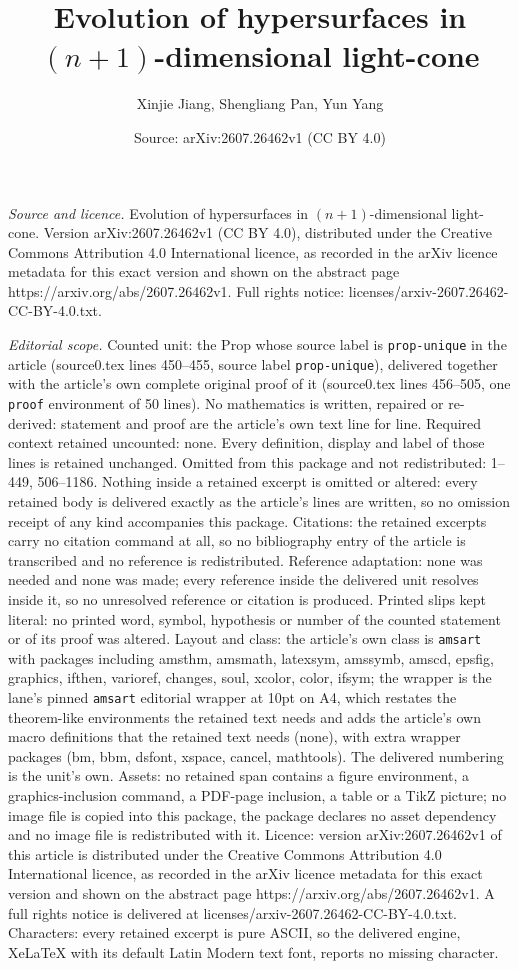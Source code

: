\documentclass[10pt,a4paper]{amsart}
\title[Evolution of hypersurfaces in $(n+1)$-dimensional light-cone]{Evolution of hypersurfaces in $(n+1)$-dimensional light-cone}
\author{Xinjie Jiang, Shengliang Pan, Yun Yang}
\date{Source: arXiv:2607.26462v1 (CC BY 4.0)}
\begin{document}
\maketitle

\noindent\emph{Source and licence.} Evolution of hypersurfaces in $(n+1)$-dimensional light-cone. Version arXiv:2607.26462v1 (CC BY 4.0), distributed under the Creative Commons Attribution 4.0 International licence, as recorded in the arXiv licence metadata for this exact version and shown on the abstract page https://arxiv.org/abs/2607.26462v1. Full rights notice: licenses/arxiv-2607.26462-CC-BY-4.0.txt.\par\smallskip

\noindent\textit{Editorial scope.} Counted unit: the Prop whose source label is \texttt{prop-unique} in the article (source0.tex lines 450--455, source label \texttt{prop-unique}), delivered together with the article's own complete original proof of it (source0.tex lines 456--505, one \texttt{proof} environment of 50 lines). No mathematics is written, repaired or re-derived: statement and proof are the article's own text line for line. Required context retained uncounted: none. Every definition, display and label of those lines is retained unchanged. Omitted from this package and not redistributed: 1--449, 506--1186. Nothing inside a retained excerpt is omitted or altered: every retained body is delivered exactly as the article's lines are written, so no omission receipt of any kind accompanies this package. Citations: the retained excerpts carry no citation command at all, so no bibliography entry of the article is transcribed and no reference is redistributed. Reference adaptation: none was needed and none was made; every reference inside the delivered unit resolves inside it, so no unresolved reference or citation is produced. Printed slips kept literal: no printed word, symbol, hypothesis or number of the counted statement or of its proof was altered. Layout and class: the article's own class is \texttt{amsart} with packages including amsthm, amsmath, latexsym, amssymb, amscd, epsfig, graphics, ifthen, varioref, changes, soul, xcolor, color, ifsym; the wrapper is the lane's pinned \texttt{amsart} editorial wrapper at 10pt on A4, which restates the theorem-like environments the retained text needs and adds the article's own macro definitions that the retained text needs (none), with extra wrapper packages (bm, bbm, dsfont, xspace, cancel, mathtools). The delivered numbering is the unit's own. Assets: no retained span contains a figure environment, a graphics-inclusion command, a PDF-page inclusion, a table or a TikZ picture; no image file is copied into this package, the package declares no asset dependency and no image file is redistributed with it. Licence: version arXiv:2607.26462v1 of this article is distributed under the Creative Commons Attribution 4.0 International licence, as recorded in the arXiv licence metadata for this exact version and shown on the abstract page https://arxiv.org/abs/2607.26462v1. A full rights notice is delivered at licenses/arxiv-2607.26462-CC-BY-4.0.txt. Characters: every retained excerpt is pure ASCII, so the delivered engine, XeLaTeX with its default Latin Modern text font, reports no missing character.
\end{document}
